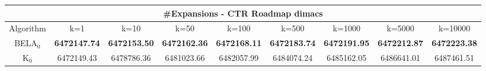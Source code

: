 \begin{tabular}{c|cccccccc}\toprule
\multicolumn{9}{c}{#Expansions - CTR Roadmap dimacs}\\ \midrule
Algorithm & k=1 & k=10 & k=50 & k=100 & k=500 & k=1000 & k=5000 & k=10000 \\ \midrule
BELA$_0$ & \textbf{6472147.74} & \textbf{6472153.50} & \textbf{6472162.36} & \textbf{6472168.11} & \textbf{6472183.74} & \textbf{6472191.95} & \textbf{6472212.87} & \textbf{6472223.38} \\
K$_0$ & 6472149.43 & 6478786.36 & 6481023.66 & 6482057.99 & 6484074.24 & 6485162.05 & 6486641.01 & 6487461.51 \\ \bottomrule 
\end{tabular}
